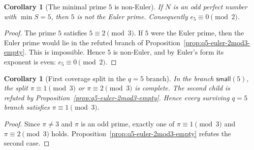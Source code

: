 \documentclass[11pt]{article}
\newtheorem{corollary}[theorem]{Corollary}
\theoremstyle{definition}
\theoremstyle{remark}
\begin{document}
\begin{corollary}[The minimal prime $5$ is non-Euler]
\label{cor:q5-minimal-prime-non-euler}
If \(N\) is an odd perfect number with \(\min S=5\), then \(5\) is not the
Euler prime.  Consequently \(e_5\equiv0\pmod2\).
\end{corollary}

\begin{proof}
The prime \(5\) satisfies \(5\equiv2\pmod3\).
If $5$ were the Euler prime, then the Euler prime would lie in the refuted branch
of Proposition~\ref{prop:q5-euler-2mod3-empty}.  This is impossible.  Hence $5$
is non-Euler, and by Euler's form its exponent is even:
\(e_5\equiv0\pmod2\).
\end{proof}

\begin{corollary}[First coverage split in the $q=5$ branch]
\label{cor:q5-first-coverage-split}
In the branch \(\mathsf{small}(5)\), the split \(\pi\equiv1\pmod3\) or
\(\pi\equiv2\pmod3\) is complete.  The second child is refuted by
Proposition~\ref{prop:q5-euler-2mod3-empty}.  Hence every surviving
\(q=5\) branch satisfies \(\pi\equiv1\pmod3\).
\end{corollary}

\begin{proof}
Since \(\pi\ne3\) and \(\pi\) is an odd prime, exactly one of
\(\pi\equiv1\pmod3\) and \(\pi\equiv2\pmod3\) holds.
Proposition~\ref{prop:q5-euler-2mod3-empty} refutes the second case.
\end{proof}
\end{document}

